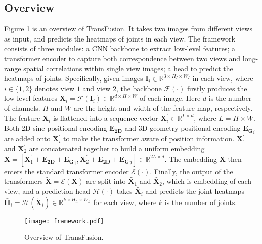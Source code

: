 \documentclass{bmvc2k}
\begin{document}
\subsection{Overview}
\vspace{-0.8em}
Figure \ref{fig:network} is an overview of TransFusion. 
It takes two images from different views as input, and predicts the heatmaps of joints in each view. The framework consists of three modules: a CNN backbone to extract low-level features; a transformer encoder to capture both correspondence between two views and long-range spatial correlations within single view images; a head to predict the heatmaps of joints. 
Specifically, given images $ \mathbf{I}_i \in \mathbb{R} ^{3 \times H_I \times W_I}$ in each view, where $i\in\{1, 2\}$ denotes view $1$ and view $2$, the backbone $\mathcal{F}(\cdot)$ firstly produces the low-level features $ \mathbf{X}_i = \mathcal{F}(\mathbf{I}_i) \in \mathbb{R}^{d \times H \times W}$ of each image. Here $d$ is the number of channels.  $H$ and $W$ are the height and width of the feature map, respectively. The feature $ \mathbf{X}_i$ is flattened into a sequence vector $\mathbf{X}_i^{'} \in \mathbb{R}^{L \times d}$, where $L= H \times W$. 
Both 2D sine positional encoding $\mathbf{E_{2D}}$ and 3D geometry positional encoding $\mathbf{E_{G}}_i$ are added onto $\mathbf{X}_i^{'}$ to make the transformer aware of position information. $ \mathbf{X}_1^{'}$ and $\mathbf{X}_2^{'}$ are concatenated together to build a uniform embedding $\mathbf{X} = [\mathbf{X}_1^{'} + \mathbf{E_{2D}} + \mathbf{E_{G}}_1 , \mathbf{X}_2^{'} + \mathbf{E_{2D}} + \mathbf{E_{G}}_2] \in \mathbb{R}^{2L \times d}$. The embedding $\mathbf{X}$ then enters the standard transformer encoder $\mathcal{E}(\cdot)$. 
Finally, the output of the transformers $\mathbf{\tilde{X}}=\mathcal{E}(\mathbf{X})$ are split into $\tilde{\mathbf{X}_1}$ and $\tilde{\mathbf{X}_2}$, which is embedding of each view, and a prediction head $\mathcal{H}(\cdot)$ takes $\tilde{\mathbf{X}_i}$ and predicts the joint heatmaps $\bar{\mathbf{H}}_i = \mathcal{H}( \tilde{ \mathbf{X}_i} ) \in \mathbb{R}^{k \times H_h \times W_h}$ for each view, where $k$ is the number of joints.   


\begin{figure}[!t]
    \centering
    \texttt{[image: framework.pdf]}
    \vspace{-1 em}
    \caption{\footnotesize{Overview of TransFusion. }}
    \label{fig:network}
\end{figure}
\end{document}
